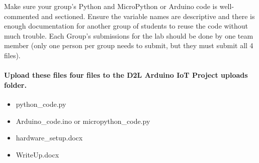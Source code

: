 \documentclass[11pt]{article}
\providecommand{\tightlist}{%
      \setlength{\itemsep}{0pt}\setlength{\parskip}{0pt}}
\begin{document}
    Make sure your group's Python and MicroPython or Arduino code is
well-commented and sectioned. Ensure the variable names are descriptive
and there is enough documentation for another group of students to reuse
the code without much trouble. Each Group's submissions for the lab
should be done by one team member (only one person per group needs to
submit, but they must submit all 4 files).

\hypertarget{upload-these-files-four-files-to-the-d2l-arduino-iot-project-uploads-folder.}{%
\paragraph{Upload these files four files to the D2L Arduino IoT Project
uploads
folder.}\label{upload-these-files-four-files-to-the-d2l-arduino-iot-project-uploads-folder.}}

\begin{itemize}
\tightlist
\item
  python\_code.py
\item
  Arduino\_code.ino or micropython\_code.py
\item
  hardware\_setup.docx
\item
  WriteUp.docx
\end{itemize}


    
    
    
    
\end{document}
